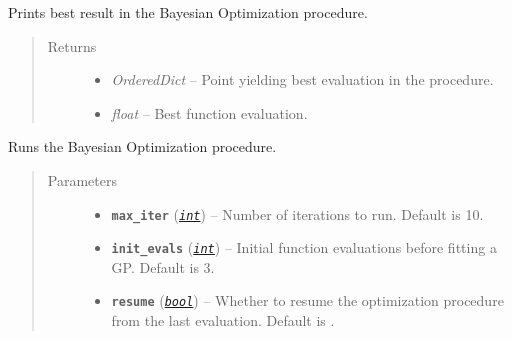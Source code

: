 \documentclass[letterpaper,10pt,english]{sphinxmanual}
\begin{document}
\begin{fulllineitems}
\begin{fulllineitems}
\end{fulllineitems}


\begin{fulllineitems}
\label{pyGPGO.GPGO:pyGPGO.GPGO.GPGO.getResult}
Prints best result in the Bayesian Optimization procedure.
\begin{quote}\begin{description}
\item[{Returns}] \leavevmode
\begin{itemize}
\item {} 
\emph{OrderedDict} -- Point yielding best evaluation in the procedure.

\item {} 
\emph{float} -- Best function evaluation.

\end{itemize}


\end{description}\end{quote}

\end{fulllineitems}


\begin{fulllineitems}
\label{pyGPGO.GPGO:pyGPGO.GPGO.GPGO.run}
Runs the Bayesian Optimization procedure.
\begin{quote}\begin{description}
\item[{Parameters}] \leavevmode\begin{itemize}
\item {} 
\textbf{\texttt{max\_iter}} (\href{https://docs.python.org/2/library/functions.html\#int}{\emph{\texttt{int}}}) -- Number of iterations to run. Default is 10.

\item {} 
\textbf{\texttt{init\_evals}} (\href{https://docs.python.org/2/library/functions.html\#int}{\emph{\texttt{int}}}) -- Initial function evaluations before fitting a GP. Default is 3.

\item {} 
\textbf{\texttt{resume}} (\href{https://docs.python.org/2/library/functions.html\#bool}{\emph{\texttt{bool}}}) -- Whether to resume the optimization procedure from the last evaluation. Default is .


\end{itemize}
\end{description}
\end{quote}
\end{fulllineitems}
\end{fulllineitems}
\end{document}

